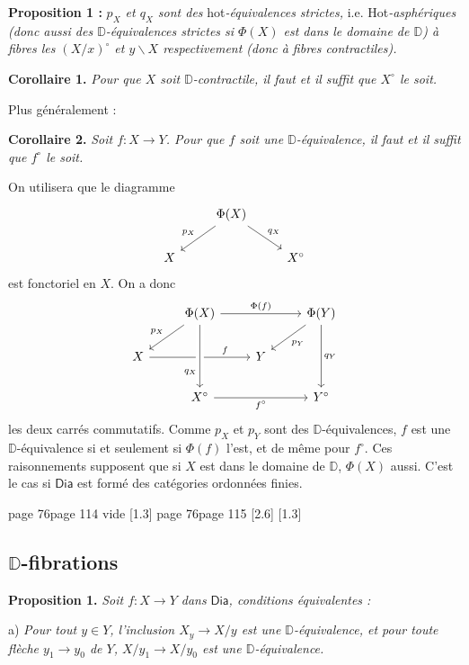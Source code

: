 \documentclass[11pt,leqno]{article}
\newcommand{\printedpage}[1]{\marginnote{\scriptsize\sffamily ed.\ #1}}
\newcommand{\msp}[1]{%
  \begingroup\def\thismsp{#1}\def\blankmsp{page 114 vide}%
  \ifx\thismsp\blankmsp
    \marginnote{\scriptsize\sffamily [114: vide]}[1.3\baselineskip]%
  \else\def\followingmsp{page 115}%
    \ifx\thismsp\followingmsp
      \marginnote{\scriptsize\sffamily [page 115]}[2.6\baselineskip]%
    \else\marginnote{\scriptsize\sffamily [#1]}[1.3\baselineskip]\fi
  \fi\endgroup}
\newcommand{\Dia}{\ensuremath{\mathsf{Dia}}}
\newcommand{\D}{\ensuremath{\mathbb{D}}}
\newcommand{\bs}{\backslash}
\begin{document}
\textbf{Proposition 1 :} \textit{$p_X$ et $q_X$ sont des} \textsf{hot}\textit{-équivalences strictes,} i.e. \textsf{Hot}\textit{-asphériques (donc aussi des $\D$-équivalences strictes si $\Phi(X)$ est dans le domaine de $\D$) à fibres les $(X/x)^\circ$ et $y\bs X$ respectivement (donc à fibres contractiles).}

\textbf{Corollaire 1.} \textit{Pour que $X$ soit $\D$-contractile, il faut et il suffit que $X^\circ$ le soit.}

\hspace*{\parindent}Plus généralement :

\textbf{Corollaire 2.} \textit{Soit $f : X \to Y$. Pour que $f$ soit une $\D$-équivalence, il faut et il suffit que $f^\circ$ le soit.}

\hspace*{\parindent}On utilisera que le diagramme
\[
\begin{tikzcd}
& \Phi(X) \arrow[dl, "p_X"'] \arrow[dr, "q_X"] & \\
X & & X^\circ
\end{tikzcd}
\]
est fonctoriel en $X$. On a donc
\[
\begin{tikzcd}
& \Phi(X) \arrow[rr, "\Phi(f)"] \arrow[dl, "p_X"'] & & \Phi(Y) \arrow[dl, "p_Y"] \arrow[dd, "q_Y"] \\
X \arrow[rr, "f" near end] \arrow[from=1-2, to=3-2, "q_X"' near end, crossing over] & & Y & \\
& X^\circ \arrow[rr, "f^\circ"'] & & Y^\circ
\end{tikzcd}
\]
les deux carrés commutatifs. Comme $p_X$ et $p_Y$ sont des $\D$-équivalences, $f$ est une $\D$-équivalence si et seulement si $\Phi(f)$ l'est, et de même pour $f^\circ$. Ces raisonnements supposent que si $X$ est dans le domaine de $\D$, $\Phi(X)$ aussi. C'est le cas si \Dia{} est formé des catégories ordonnées finies.

\printedpage{46}
\msp{page 76}

\subsection*{$\D$-fibrations}

\textbf{Proposition 1.} \textit{Soit $f : X \to Y$ dans} \Dia\textit{, conditions équivalentes :}

\hspace*{\parindent}a) \textit{Pour tout $y \in Y$, l'inclusion $X_y \to X/y$ est une $\D$-équivalence, et pour toute flèche $y_1 \to y_0$ de $Y$, $X/y_1 \to X/y_0$ est une $\D$-équivalence.}
\end{document}
